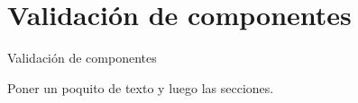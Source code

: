\section{Validaci\'on de componentes}
\label{Validacion_componentes}

Validaci\'on de componentes
\par
Poner un poquito de texto y luego las secciones.